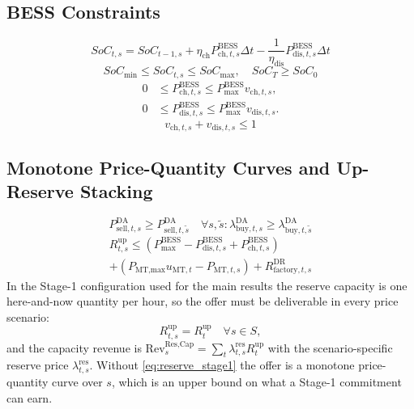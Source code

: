 \documentclass[journal]{IEEEtran}
\begin{document}
\subsection{BESS Constraints}
\begin{equation}
SoC_{t,s} = SoC_{t-1,s} + \eta_{\text{ch}} P_{\text{ch},t,s}^{\text{BESS}} \Delta t - \frac{1}{\eta_{\text{dis}}} P_{\text{dis},t,s}^{\text{BESS}} \Delta t
\end{equation}
\begin{equation}
SoC_{\text{min}} \le SoC_{t,s} \le SoC_{\text{max}}, \quad SoC_T \ge SoC_0
\end{equation}
\begin{equation}
\begin{aligned}
0 &\leq P_{\text{ch},t,s}^{\text{BESS}}
\leq P_{\max}^{\text{BESS}}v_{\text{ch},t,s},\\
0 &\leq P_{\text{dis},t,s}^{\text{BESS}}
\leq P_{\max}^{\text{BESS}}v_{\text{dis},t,s}.
\end{aligned}
\label{eq}
\end{equation}
\begin{equation}
v_{\text{ch},t,s} + v_{\text{dis},t,s} \le 1
\end{equation}

\subsection{Monotone Price-Quantity Curves and Up-Reserve Stacking}
\begin{equation}
P_{\text{sell},t,s}^{\text{DA}} \ge P_{\text{sell},t,\tilde{s}}^{\text{DA}} \quad \forall s, \tilde{s}: \lambda_{\text{buy},t,s}^{\text{DA}} \ge \lambda_{\text{buy},t,\tilde{s}}^{\text{DA}}
\end{equation}
\begin{align}
R_{t,s}^{\text{up}} \le \left( P_{\text{max}}^{\text{BESS}} - P_{\text{dis},t,s}^{\text{BESS}} + P_{\text{ch},t,s}^{\text{BESS}} \right) \nonumber \\
+ \left( P_{\text{MT,max}} u_{\text{MT},t} - P_{\text{MT},t,s} \right) + R_{\text{factory},t,s}^{\text{DR}}
\end{align}
In the Stage-1 configuration used for the main results the reserve capacity is one here-and-now quantity per hour, so the offer must be deliverable in every price scenario:
\begin{equation}
R_{t,s}^{\text{up}} = R_{t}^{\text{up}} \quad \forall s \in S,
\label{eq:reserve_stage1}
\end{equation}
and the capacity revenue is $\text{Rev}_{s}^{\text{Res,Cap}}=\sum_{t}\lambda_{t,s}^{\text{res}}R_{t}^{\text{up}}$ with the scenario-specific reserve price $\lambda_{t,s}^{\text{res}}$. Without \eqref{eq:reserve_stage1} the offer is a monotone price-quantity curve over $s$, which is an upper bound on what a Stage-1 commitment can earn.
\end{document}
